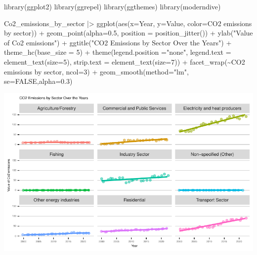 \documentclass[
  letterpaper,
  DIV=11,
  numbers=noendperiod]{scrartcl}
\newenvironment{Shaded}{\begin{snugshade}}{\end{snugshade}}
\newcommand{\AttributeTok}[1]{\textcolor[rgb]{0.40,0.45,0.13}{#1}}
\newcommand{\ConstantTok}[1]{\textcolor[rgb]{0.56,0.35,0.01}{#1}}
\newcommand{\DecValTok}[1]{\textcolor[rgb]{0.68,0.00,0.00}{#1}}
\newcommand{\FloatTok}[1]{\textcolor[rgb]{0.68,0.00,0.00}{#1}}
\newcommand{\FunctionTok}[1]{\textcolor[rgb]{0.28,0.35,0.67}{#1}}
\newcommand{\NormalTok}[1]{\textcolor[rgb]{0.00,0.23,0.31}{#1}}
\newcommand{\SpecialCharTok}[1]{\textcolor[rgb]{0.37,0.37,0.37}{#1}}
\newcommand{\StringTok}[1]{\textcolor[rgb]{0.13,0.47,0.30}{#1}}
\begin{document}
\begin{Shaded}
\begin{Highlighting}[]
\FunctionTok{library}\NormalTok{(ggplot2)}
\FunctionTok{library}\NormalTok{(ggrepel)}
\FunctionTok{library}\NormalTok{(ggthemes)}
\FunctionTok{library}\NormalTok{(moderndive)}

\NormalTok{Co2\_emissions\_by\_sector }\SpecialCharTok{|\textgreater{}}  \FunctionTok{ggplot}\NormalTok{(}\FunctionTok{aes}\NormalTok{(}\AttributeTok{x=}\NormalTok{Year, }\AttributeTok{y=}\NormalTok{Value, }\AttributeTok{color=}\StringTok{\textasciigrave{}}\AttributeTok{CO2 emissions by sector}\StringTok{\textasciigrave{}}\NormalTok{)) }\SpecialCharTok{+} \FunctionTok{geom\_point}\NormalTok{(}\AttributeTok{alpha=}\FloatTok{0.5}\NormalTok{, }\AttributeTok{position =} \FunctionTok{position\_jitter}\NormalTok{()) }\SpecialCharTok{+} \FunctionTok{ylab}\NormalTok{(}\StringTok{"Value of Co2 emissions"}\NormalTok{) }\SpecialCharTok{+} \FunctionTok{ggtitle}\NormalTok{(}\StringTok{"CO2 Emissions by Sector Over the Years"}\NormalTok{) }\SpecialCharTok{+} \FunctionTok{theme\_hc}\NormalTok{(}\AttributeTok{base\_size =} \DecValTok{5}\NormalTok{) }\SpecialCharTok{+} \FunctionTok{theme}\NormalTok{(}\AttributeTok{legend.position =}\StringTok{"none"}\NormalTok{, }\AttributeTok{legend.text =} \FunctionTok{element\_text}\NormalTok{(}\AttributeTok{size=}\DecValTok{5}\NormalTok{), }\AttributeTok{strip.text =} \FunctionTok{element\_text}\NormalTok{(}\AttributeTok{size=}\DecValTok{7}\NormalTok{)) }\SpecialCharTok{+} \FunctionTok{facet\_wrap}\NormalTok{(}\SpecialCharTok{\textasciitilde{}}\StringTok{\textasciigrave{}}\AttributeTok{CO2 emissions by sector}\StringTok{\textasciigrave{}}\NormalTok{, }\AttributeTok{ncol=}\DecValTok{3}\NormalTok{) }\SpecialCharTok{+} \FunctionTok{geom\_smooth}\NormalTok{(}\AttributeTok{method=}\StringTok{"lm"}\NormalTok{, }\AttributeTok{se=}\ConstantTok{FALSE}\NormalTok{,}\AttributeTok{alpha=}\FloatTok{0.3}\NormalTok{)}
\end{Highlighting}
\end{Shaded}

\includegraphics{project_files/figure-pdf/unnamed-chunk-18-1.pdf}
\end{document}
